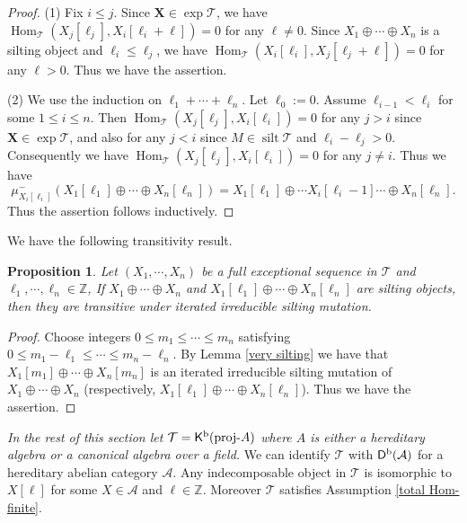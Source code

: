 \documentclass[a4paper,reqno]{amsart}
\newtheorem{proposition}[theorem]{Proposition}
\theoremstyle{definition}
\newcommand{\TT}{{\mathcal T}}
\newcommand{\Z}{\mathbb{Z}}
\newcommand{\Hom}{\operatorname{Hom}\nolimits}
\newcommand{\silt}{\operatorname{silt}\nolimits}
\newcommand{\proj}[1]{{\rm{proj}}\text{-}#1} %
\newcommand{\exc}{\operatorname{exp}\nolimits}
\newcommand{\K}{\mathsf{K}}
\newcommand{\D}{\mathsf{D}}
\renewcommand{\AA}{{\mathcal A}}
\begin{document}
\begin{proof}
(1) Fix $i\le j$. Since ${\mathbf X}\in\exc\TT$, we have
$\Hom_{\TT}(X_j[\ell_j],X_i[\ell_i+\ell])=0$ for any $\ell\neq0$.
Since $X_1\oplus\cdots\oplus X_n$ is a silting object and $\ell_i\le\ell_j$,
we have $\Hom_{\TT}(X_i[\ell_i],X_j[\ell_j+\ell])=0$ for any $\ell>0$.
Thus we have the assertion.

(2) We use the induction on $\ell_1+\cdots+\ell_n$.
Let $\ell_0:=0$. Assume $\ell_{i-1}<\ell_i$ for some $1\le i\le n$.
Then $\Hom_{\TT}(X_j[\ell_j],X_i[\ell_i])=0$ for any $j>i$ since ${\mathbf X}\in\exc\TT$,
and also for any $j<i$ since $M\in\silt\TT$ and $\ell_i-\ell_j>0$.
Consequently we have $\Hom_{\TT}(X_j[\ell_j],X_i[\ell_i])=0$ for any $j\neq i$.
Thus we have
\[\mu_{X_i[\ell_i]}^-(X_1[\ell_1]\oplus\cdots\oplus X_n[\ell_n])=
X_1[\ell_1]\oplus\cdots X_i[\ell_i-1]\cdots\oplus X_n[\ell_n].\]
Thus the assertion follows inductively.
%
%
\end{proof}

We have the following transitivity result.

\begin{proposition}\label{first transitivity}
Let $(X_1,\cdots,X_n)$ be a full exceptional sequence in $\TT$
and $\ell_1,\cdots,\ell_n\in\Z$,
If $X_1\oplus\cdots\oplus X_n$ and
$X_1[\ell_1]\oplus\cdots\oplus X_n[\ell_n]$ are silting objects,
then they are transitive under iterated irreducible silting mutation.
\end{proposition}

\begin{proof}
Choose integers $0\le m_1\le\cdots\le m_n$ satisfying
$0\le m_1-\ell_1\le\cdots\le m_n-\ell_n$.
By Lemma \ref{very silting} we have that
$X_1[m_1]\oplus\cdots\oplus X_n[m_n]$ is an iterated irreducible silting mutation of $X_1\oplus\cdots\oplus X_n$
(respectively, $X_1[\ell_1]\oplus\cdots\oplus X_n[\ell_n]$).
Thus we have the assertion.
\end{proof}

\emph{In the rest of this section let $\TT=\K^{\rm b}(\proj{A})$
where $A$ is either a hereditary algebra or a canonical algebra over a field.}
We can identify $\TT$ with $\D^{\rm b}(\AA)$ for a hereditary abelian
category $\AA$.
Any indecomposable object in $\TT$ is isomorphic to $X[\ell]$ for some
$X\in\AA$ and $\ell\in\Z$.
Moreover $\TT$ satisfies Assumption \ref{total Hom-finite}.
\end{document}

